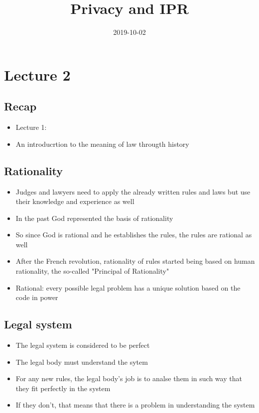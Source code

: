 \documentclass{article}
\title{Privacy and IPR}
\date{2019-10-02}
\begin{document}
   \maketitle 
   \newpage

\section{Lecture 2}

\subsection{Recap}
\begin{itemize}
\item Lecture 1:
\item An introducrtion to the meaning of law througth history
\end{itemize}

\subsection{Rationality}

\begin{itemize}
\item Judges and lawyers need to apply the already written rules and laws but use their knowledge and experience as well
\item In the past God represented the basis of rationality
\item So since God is rational and he establishes the rules, the rules are rational as well
\item After the French revolution, rationality of rules started being based on human rationality, the so-called "Principal of Rationality"
\item Rational: every possible legal problem has a unique solution based on the code in power 
\end{itemize}

\subsection{Legal system}
\begin{itemize}
\item The legal system is considered to be perfect 
\item The legal body must understand the sytem 
\item For any new rules, the legal body's job is to analse them in such way that they fit perfectly in the system
\item If they don't, that means that there is a problem in understanding the system 
\end{itemize}
\end{document}
